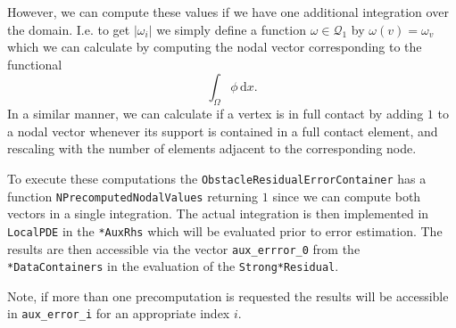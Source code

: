  However, we can compute these values if we have one additional
 integration over the domain. I.e. to get $|\omega_i|$ we simply
 define a function $\omega \in \mathcal Q_1$ by $\omega(v) = \omega_v$
 which we can calculate by computing the nodal vector corresponding to
 the functional
 \[
   \int_\Omega \phi\,\mathrm{d}x.
 \]
 In a similar manner, we can calculate if a vertex is in full contact
 by adding $1$ to a nodal vector whenever its support is contained in
 a full contact element, and rescaling with the number of elements
 adjacent to the corresponding node.

 To execute these computations the \texttt{ObstacleResidualErrorContainer}
 has a function \texttt{NPrecomputedNodalValues} returning $1$ since we
 can compute both vectors in a single integration. The actual
 integration is then implemented in \texttt{LocalPDE} in the
 \texttt{*AuxRhs} which will be evaluated prior to error estimation.
 The results are then accessible via the vector
 \texttt{aux\_errror\_0} from the \texttt{*DataContainers} in the
 evaluation of the \texttt{Strong*Residual}.

 Note, if more than one precomputation is requested the results will
 be accessible in \texttt{aux\_error\_i} for an appropriate index $i$.
 
